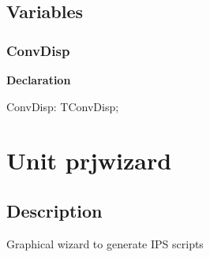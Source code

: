 \documentclass{report}
\newif\ifpdf
\begin{document}
\section{Variables}
\ifpdf
\subsection*{\large{\textbf{ConvDisp}}\normalsize\hspace{1ex}\hrulefill}
\else
\subsection*{ConvDisp}
\fi
\label{pkgconvertdisp-ConvDisp}
\begin{list}{}{
\setlength{\itemindent}{0cm}
\setlength{\listparindent}{0cm}
\setlength{\leftmargin}{\evensidemargin}
\addtolength{\leftmargin}{\tmplength}
\settowidth{\labelsep}{X}
\addtolength{\leftmargin}{\labelsep}
\setlength{\labelwidth}{\tmplength}
}
\item[\textbf{Declaration}\hfill]
\ifpdf
\begin{flushleft}
\fi
\begin{ttfamily}
ConvDisp: TConvDisp;\end{ttfamily}

\ifpdf
\end{flushleft}
\fi

\end{list}
\chapter{Unit prjwizard}
\label{prjwizard}
\section{Description}
Graphical wizard to generate IPS scripts
\end{document}

